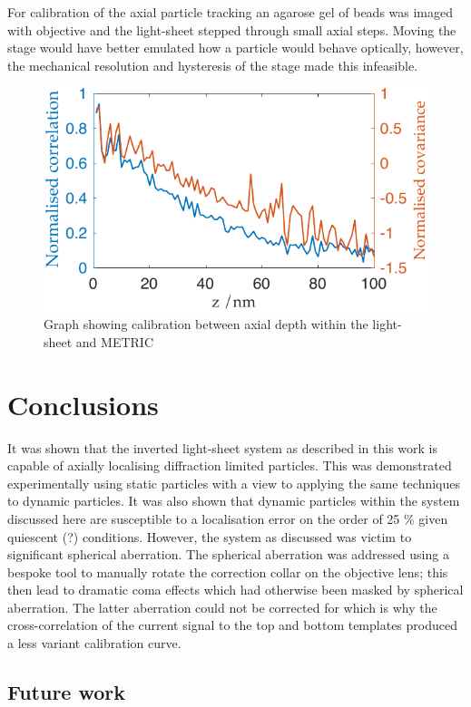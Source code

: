 For calibration of the axial particle tracking an agarose gel of beads was imaged with objective and the light-sheet stepped through small axial steps.
Moving the stage would have better emulated how a particle would behave optically, however, the mechanical resolution and hysteresis of the stage made this infeasible.

\begin{figure}
  \centering
  \includegraphics{./calibration/Calibration.pdf}
  \caption{Graph showing calibration between axial depth within the light-sheet and METRIC}
  \label{}
\end{figure}

\section{Conclusions}

It was shown that the inverted light-sheet system as described in this work is capable of axially localising diffraction limited particles.
This was demonstrated experimentally using static particles with a view to applying the same techniques to dynamic particles.
It was also shown that dynamic particles within the system discussed here are susceptible to a localisation error on the order of 25 \% given quiescent (?) conditions.
However, the system as discussed was victim to significant spherical aberration.
The spherical aberration was addressed using a bespoke tool to manually rotate the correction collar on the objective lens; this then lead to dramatic coma effects which had otherwise been masked by spherical aberration.
The latter aberration could not be corrected for which is why the cross-correlation of the current signal to the top and bottom templates produced a less variant calibration curve.

\subsection{Future work}

